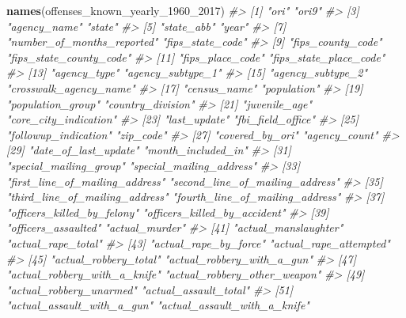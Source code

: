 \documentclass[
  12pt,
]{book}
\newenvironment{Shaded}{\begin{snugshade}}{\end{snugshade}}
\newcommand{\CommentTok}[1]{\textcolor[rgb]{0.37,0.37,0.37}{\textit{#1}}}
\newcommand{\DecValTok}[1]{\textcolor[rgb]{0.06,0.06,0.06}{#1}}
\newcommand{\KeywordTok}[1]{\textcolor[rgb]{0.27,0.27,0.27}{\textbf{#1}}}
\newcommand{\NormalTok}[1]{#1}
\begin{document}
\begin{Shaded}
\begin{Highlighting}[]
\KeywordTok{names}\NormalTok{(offenses\_known\_yearly\_}\DecValTok{1960}\NormalTok{\_}\DecValTok{2017}\NormalTok{)}
\CommentTok{\#>   [1] "ori"                            "ori9"                          }
\CommentTok{\#>   [3] "agency\_name"                    "state"                         }
\CommentTok{\#>   [5] "state\_abb"                      "year"                          }
\CommentTok{\#>   [7] "number\_of\_months\_reported"      "fips\_state\_code"               }
\CommentTok{\#>   [9] "fips\_county\_code"               "fips\_state\_county\_code"        }
\CommentTok{\#>  [11] "fips\_place\_code"                "fips\_state\_place\_code"         }
\CommentTok{\#>  [13] "agency\_type"                    "agency\_subtype\_1"              }
\CommentTok{\#>  [15] "agency\_subtype\_2"               "crosswalk\_agency\_name"         }
\CommentTok{\#>  [17] "census\_name"                    "population"                    }
\CommentTok{\#>  [19] "population\_group"               "country\_division"              }
\CommentTok{\#>  [21] "juvenile\_age"                   "core\_city\_indication"          }
\CommentTok{\#>  [23] "last\_update"                    "fbi\_field\_office"              }
\CommentTok{\#>  [25] "followup\_indication"            "zip\_code"                      }
\CommentTok{\#>  [27] "covered\_by\_ori"                 "agency\_count"                  }
\CommentTok{\#>  [29] "date\_of\_last\_update"            "month\_included\_in"             }
\CommentTok{\#>  [31] "special\_mailing\_group"          "special\_mailing\_address"       }
\CommentTok{\#>  [33] "first\_line\_of\_mailing\_address"  "second\_line\_of\_mailing\_address"}
\CommentTok{\#>  [35] "third\_line\_of\_mailing\_address"  "fourth\_line\_of\_mailing\_address"}
\CommentTok{\#>  [37] "officers\_killed\_by\_felony"      "officers\_killed\_by\_accident"   }
\CommentTok{\#>  [39] "officers\_assaulted"             "actual\_murder"                 }
\CommentTok{\#>  [41] "actual\_manslaughter"            "actual\_rape\_total"             }
\CommentTok{\#>  [43] "actual\_rape\_by\_force"           "actual\_rape\_attempted"         }
\CommentTok{\#>  [45] "actual\_robbery\_total"           "actual\_robbery\_with\_a\_gun"     }
\CommentTok{\#>  [47] "actual\_robbery\_with\_a\_knife"    "actual\_robbery\_other\_weapon"   }
\CommentTok{\#>  [49] "actual\_robbery\_unarmed"         "actual\_assault\_total"          }
\CommentTok{\#>  [51] "actual\_assault\_with\_a\_gun"      "actual\_assault\_with\_a\_knife"   }

\end{Highlighting}
\end{Shaded}
\end{document}
